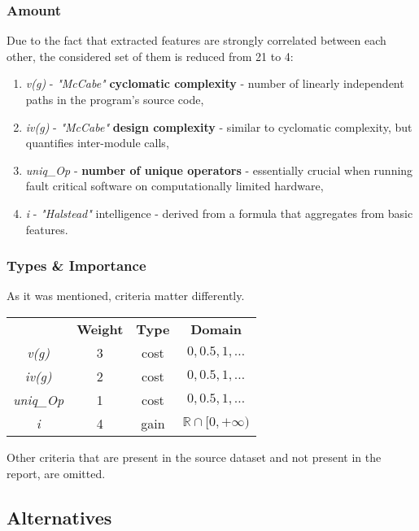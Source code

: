 \documentclass{article}
\begin{document}
\subsubsection{Amount}
Due to the fact that extracted features are strongly correlated between each other, the considered set of them is reduced from 21 to 4:

\begin{enumerate}
    \item \textit{v(g)} - \textit{"McCabe"} \textbf{cyclomatic complexity} - number of linearly independent paths in the program's source code,
    \item \textit{iv(g)} - \textit{"McCabe"} \textbf{design complexity} - similar to cyclomatic complexity, but quantifies inter-module calls,
    \item \textit{uniq\_Op} - \textbf{number of unique operators} - essentially crucial when running fault critical software on computationally limited hardware,
    \item \textit{i} - \textit{"Halstead"} intelligence - derived from a formula that aggregates from basic features.
\end{enumerate}

\subsubsection{Types \& Importance}
As it was mentioned, criteria matter differently.

\begin{center}
\begin{tabular}{ |c|c|c|c| }
    & \textbf{Weight} & \textbf{Type} & \textbf{Domain} \\
    \textit{v(g)} & 3 & cost & $0, 0.5, 1, \dots$ \\
    \textit{iv(g)} & 2 & cost & $0, 0.5, 1, \dots$ \\
    \textit{uniq\_Op} & 1 & cost & $0, 0.5, 1, \dots$ \\
    \textit{i} & 4 & gain & $\mathbb{R} \cap [0, +\infty)$ \\
\end{tabular}
\end{center}

\noindent Other criteria that are present in the source dataset and not present in the report, are omitted.

\subsection{Alternatives}
\end{document}
